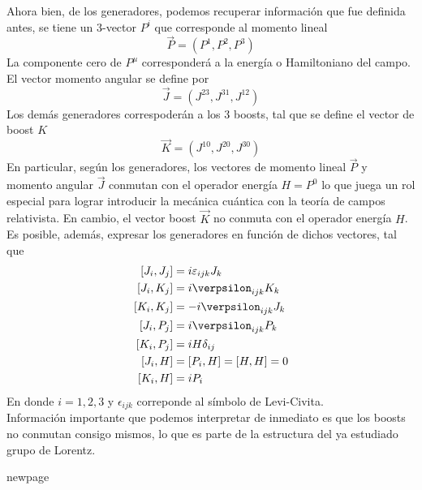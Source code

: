 \documentclass[12pt,letterpaper]{article}
\begin{document}
Ahora bien, de los generadores, podemos recuperar información que fue definida antes, se tiene un 3-vector $P^i$ que corresponde al momento lineal
\begin{equation}
  \vec{P} = \left( P^1, P^2, P^3 \right)
\end{equation}
La componente cero de $P^\mu$ corresponderá a la energía o Hamiltoniano del campo. El vector momento angular se define por
\begin{equation}
  \vec{J} = \left( J^{23} , J^{31} , J^{12} \right)
\end{equation}
Los demás generadores correspoderán a los 3 boosts, tal que se define el vector de boost $K$
\begin{equation}
  \vec{K} = \left( J^{10} , J^{20}, J^{30} \right)
\end{equation}
En particular, según los generadores, los vectores de momento lineal $\vec{P}$ y momento angular $\vec{J}$ conmutan con el operador energía $H=P^0$ lo que juega un rol especial para lograr introducir la mecánica cuántica con la teoría de campos relativista. En cambio, el vector boost $\vec{K}$  no conmuta con el operador energía $H$. Es posible, además, expresar los generadores en función de dichos vectores, tal que
\begin{align}
  \left[ J_i,J_j \right] & = i\varepsilon_{ijk}J_k\\
  \left[ J_i , K_j \right] & = i\verpsilon_{ijk}K_k \\
  \left[ K_i,K_j \right] & =-i\verpsilon_{ijk}J_k \\
  \left[ J_i , P_j\right] & = i\verpsilon_{ijk}P_k \\
  \left[ K_i,P_j \right] & = iH\delta_{ij} \\
  \left[ J_i , H \right] & = \left[ P_i, H \right] = \left[ H , H \right] = 0  \\
  \left[ K_i, H \right] & = iP_i
\end{align}
En donde $i=1,2,3$ y $\epsilon_{ijk}$ correponde al símbolo de Levi-Civita. \\ 
Información importante que podemos interpretar de inmediato es que los boosts no conmutan consigo mismos, lo que es parte de la estructura del ya estudiado grupo de Lorentz.

newpage

\end{document}
